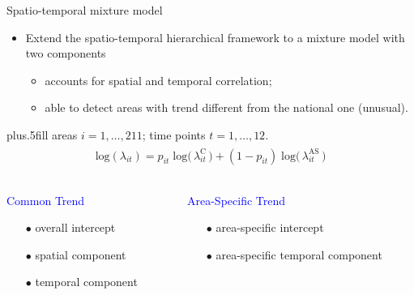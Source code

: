 \documentclass[slidestop,compress,serif,10pt]{beamer}
\begin{document}
\begin{frame}{Spatio-temporal mixture model}
\begin{itemize}
\item Extend the spatio-temporal hierarchical framework to a mixture model with two components
    \begin{itemize}
    \vfill\item accounts for spatial  and temporal correlation;
\vfill\item able to detect areas with trend different from the national one (unusual).
   \end{itemize}
\end{itemize}

  \vskip0pt plus.5fill
\small{areas  $i=1, \dots, 211$; time points $t=1, \dots, 12$}.
\medskip
\begin{align*}
\begin{split}
 \mbox{log} (\lambda_{it}) = p_{it} \;  \mbox{log}\big(\,\lambda_{it}^{\mbox{C}}\,\big)  + (1-p_{it}) \; \mbox{log}\big(\, \lambda_{it}^{\mbox{AS}}\, \big)  
\end{split}
\end{align*}
\centering





\begin{columns}
\begin{column}[T]{0.37\textwidth}
\centering
\textcolor{blue}{Common Trend}
\begin{itemize}
\item[$\bullet$] overall intercept
\item[$\bullet$]  spatial component
\item[$\bullet$]  temporal component
\end{itemize}
\end{column}
\begin{column}[T]{0.4\textwidth}
\textcolor{blue}{Area-Specific Trend}
\centering
\begin{itemize}
\centering
\item[$\bullet$]  area-specific intercept
\item[$\bullet$] area-specific temporal component
\end{itemize}
\end{column}
\end{columns}


\end{frame}
\end{document}
